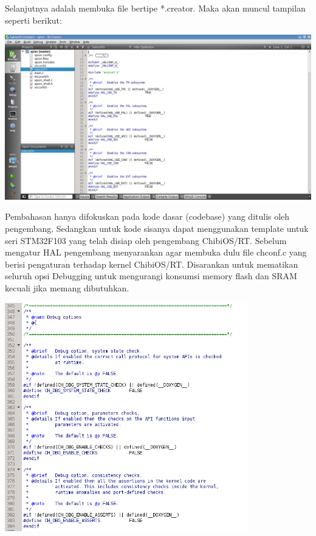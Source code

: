 \documentclass[11pt,fleqn]{book} %
\begin{document}
\begin{flushleft}
\hspace{10pt} Selanjutnya adalah membuka file bertipe *.creator.
Maka akan muncul tampilan seperti berikut:
\newpage
 \begin{center}
 \includegraphics[width=400pt]{./screenshot/rtos/hal1}\\
\end{center}
\hspace{10pt} Pembahasan hanya difokuskan pada kode dasar (codebase) yang ditulis oleh pengembang.
Sedangkan untuk kode sisanya dapat menggunakan template untuk seri STM32F103 yang telah disiap oleh pengembang ChibiOS/RT.
Sebelum mengatur HAL pengembang menyarankan agar membuka dulu file chconf.c yang berisi pengaturan terhadap kernel ChibiOS/RT.
Disarankan untuk mematikan seluruh opsi Debugging untuk mengurangi konsumsi memory flash dan SRAM kecuali jika memang dibutuhkan.
 \begin{center}
 \includegraphics[width=300pt]{./screenshot/rtos/hal2}\\
\end{center}
\end{flushleft}
\end{document}
